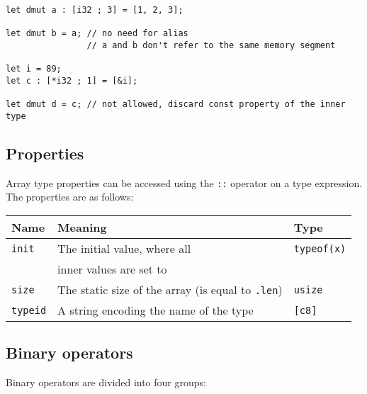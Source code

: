 \begin{lstlisting}[style=coloredverbatim]
let dmut a : [i32 ; 3] = [1, 2, 3];

let dmut b = a; // no need for alias
                // a and b don't refer to the same memory segment

let i = 89;
let c : [*i32 ; 1] = [&i];

let dmut d = c; // not allowed, discard const property of the inner type
\end{lstlisting}



\subsection {Properties}

Array type properties can be accessed using the \texttt{::} operator on a type
expression. The properties are as follows:

\begin{center}\begin{adjustbox}{max width=\linewidth}
  \begin{tabular}{|l|ll|}
    \hline
    Name & Meaning & Type\\
    \hline
    \hline
    \texttt{init} & The initial value, where all & \texttt{typeof(x)} \\
    & inner values are set to  & \\
    \Xhline{0.001pt}
    \texttt{size} & The static size of the array (is equal to \texttt{.len}) & \texttt{usize} \\
    \hline
    \texttt{typeid} & A string encoding the name of the type & \texttt{[c8]} \\
    \hline
  \end{tabular}
\end{adjustbox}\end{center}

\subsection {Binary operators}

Binary operators are divided into four groups:

